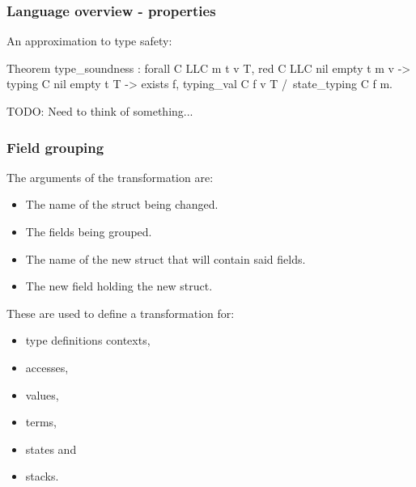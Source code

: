 \begin{frame}[fragile]
\frametitle{Language overview - properties}

An approximation to type safety:
\begin{coq}
  Theorem type_soundness : forall C LLC m t v T,
    red C LLC nil empty t m v ->
    typing C nil empty t T ->
    exists f, typing_val C f v T 
  	  /\  state_typing C f m.
\end{coq}

\bigskip

TODO: Need to think of something...

\end{frame}


\begin{frame}[fragile]
\frametitle{Field grouping}

The arguments of the transformation are:
\begin{itemize}
	\item The name of the struct being changed.
	\item The fields being grouped.
	\item The name of the new struct that will contain said fields.
	\item The new field holding the new struct.
\end{itemize}

\bigskip

These are used to define a transformation for:
\\[0.75em]
\begin{minipage}{0.45\linewidth}
\begin{itemize}
	\item type definitions contexts,
	\item accesses,
	\item values,
\end{itemize}
\end{minipage}%
\begin{minipage}{0.45\linewidth}
\begin{itemize}
	\item terms,
	\item states and
	\item stacks.
\end{itemize}
\end{minipage}

\end{frame}


